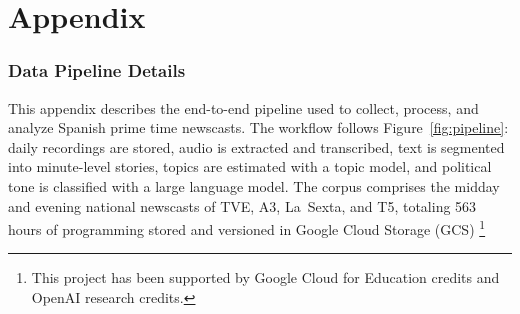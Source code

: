 \documentclass[12pt]{article}
\begin{document}
	\pagestyle{plain}  
	
		
	
	
	
	\clearpage

\appendix

\part{Appendix} %

\parttoc %


\renewcommand\thefigure{\thesection.\arabic{figure}}   
\renewcommand\thetable{\thesection.\arabic{table}}
\setcounter{table}{0}


\clearpage






\section{Data Pipeline  Details}\label{sec:appendix_models}



This appendix describes the end-to-end pipeline used to collect, process, and analyze Spanish prime time newscasts. The workflow follows  Figure~\ref{fig:pipeline}: daily recordings are stored, audio is extracted and transcribed, text is segmented into minute-level stories, topics are estimated with a topic model, and political tone is classified with a large language model. The corpus comprises the midday and evening national newscasts of TVE, A3, La~Sexta, and T5, totaling {563 hours} of programming stored and versioned in Google Cloud Storage (GCS) \footnote{This project has been supported by Google Cloud for Education credits and OpenAI research credits.} %
\end{document}

